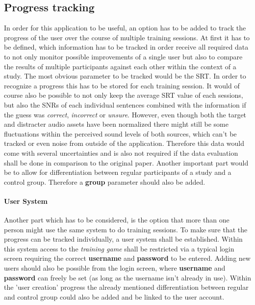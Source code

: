 \documentclass[a4paper,11pt]{article}%
\renewcommand{\\}{\vspace*{0.5\baselineskip} \newline}
\begin{document}
\subsection{Progress tracking}
In order for this application to be useful, an option has to be added to track the progress of the user over the course of multiple training sessions. At first it has to be defined, which information has to be tracked in order receive all required data to not only monitor possible improvements of a single user but also to compare the results of multiple participants against each other within the context of a study.
\newline
\newline
The most obvious parameter to be tracked would be the \ac{SRT}. In order to recognize a progress this has to be stored for each training session. It would of course also be possible to not only keep the average \ac{SRT} value of each sessions, but also the \ac{SNR}s of each individual sentences combined with the information if the guess was \textit{correct}, \textit{incorrect} or \textit{unsure}. However, even though both the target and distracter audio assets have been normalized there might still be some fluctuations within the perceived sound levels of both sources, which can't be tracked or even noise from outside of the application. Therefore this data would come with several uncertainties and is also not required if the data evaluation shall be done in comparison to the original paper.
\newline
\newline
Another important part would be to allow for differentiation between regular participants of a study and a control group. Therefore a \textbf{group} parameter should also be added.


\paragraph{User System} Another part which has to be considered, is the option that more than one person might use the same system to do training sessions. To make sure that the progress can be tracked individually, a user system shall be established. Within this system access to the \textit{training game} shall be restricted via a typical login screen requiring the correct \textbf{username} and \textbf{password} to be entered. Adding new users should also be possible from the login screen, where \textbf{username} and \textbf{password} can freely be set (as long as the username isn't already in use). Within the 'user creation' progress the already mentioned differentiation between regular and control group could also be added and be linked to the user account.
\end{document}
